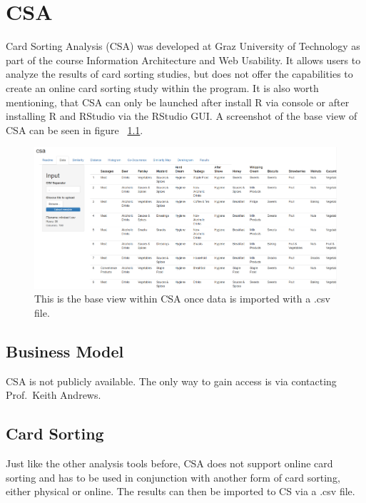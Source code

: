 \chapter{CSA}

\label{chap:CSA}

Card Sorting Analysis (CSA) was developed at Graz University of
Technology as part of the course Information Architecture and Web
Usability. It allows users to analyze the results of card sorting
studies, but does not offer the capabilities to create an online card
sorting study within the program. It is also worth mentioning, that
CSA can only be launched after install R via console or after
installing R and RStudio via the RStudio GUI. A screenshot of the base view
of CSA can be seen in figure  ~\ref{fig:CSA1}.


\begin{figure}[tp] 
\centering
\includegraphics[keepaspectratio,width=\linewidth,height=\halfh]{images/csa-data.png}
\caption[CSA Application] { This is the base view within CSA
once data is imported with a .csv file.
}
\label{fig:CSA1}
\end{figure}



\section{Business Model}

CSA is not publicly available. The only way to gain access is via contacting 
Prof.\ Keith Andrews.


\section{Card Sorting}

Just like the other analysis tools before, CSA does not support online card 
sorting and has to be used in conjunction with another form of card sorting, 
either physical or online. The results can then be imported to CS via a .csv 
file.




